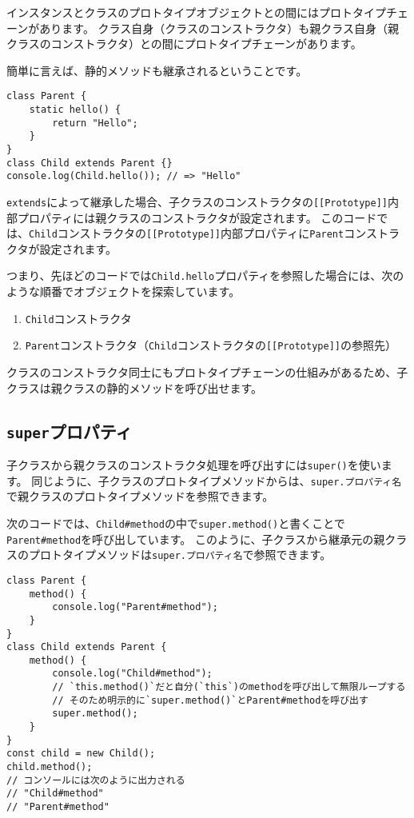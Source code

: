 インスタンスとクラスのプロトタイプオブジェクトとの間にはプロトタイプチェーンがあります。
クラス自身（クラスのコンストラクタ）も親クラス自身（親クラスのコンストラクタ）との間にプロトタイプチェーンがあります。

簡単に言えば、静的メソッドも継承されるということです。

\begin{lstlisting}
class Parent {
    static hello() {
        return "Hello";
    }
}
class Child extends Parent {}
console.log(Child.hello()); // => "Hello"
\end{lstlisting}

\texttt{extends}によって継承した場合、子クラスのコンストラクタの\texttt{[[Prototype]]}内部プロパティには親クラスのコンストラクタが設定されます。
このコードでは、\texttt{Child}コンストラクタの\texttt{[[Prototype]]}内部プロパティに\texttt{Parent}コンストラクタが設定されます。

つまり、先ほどのコードでは\texttt{Child.hello}プロパティを参照した場合には、次のような順番でオブジェクトを探索しています。

\begin{enumerate}
\def\labelenumi{\arabic{enumi}.}
\item
  \texttt{Child}コンストラクタ
\item
  \texttt{Parent}コンストラクタ（\texttt{Child}コンストラクタの\texttt{[[Prototype]]}の参照先）
\end{enumerate}

クラスのコンストラクタ同士にもプロトタイプチェーンの仕組みがあるため、子クラスは親クラスの静的メソッドを呼び出せます。

\hypertarget{super-property}{%
\subsection{\texorpdfstring{\texttt{super}プロパティ}{superプロパティ}}\label{super-property}}

子クラスから親クラスのコンストラクタ処理を呼び出すには\texttt{super()}を使います。
同じように、子クラスのプロトタイプメソッドからは、\texttt{super.プロパティ名}で親クラスのプロトタイプメソッドを参照できます。

次のコードでは、\texttt{Child\#method}の中で\texttt{super.method()}と書くことで\texttt{Parent\#method}を呼び出しています。
このように、子クラスから継承元の親クラスのプロトタイプメソッドは\texttt{super.プロパティ名}で参照できます。

\begin{lstlisting}
class Parent {
    method() {
        console.log("Parent#method");
    }
}
class Child extends Parent {
    method() {
        console.log("Child#method");
        // `this.method()`だと自分(`this`)のmethodを呼び出して無限ループする
        // そのため明示的に`super.method()`とParent#methodを呼び出す
        super.method();
    }
}
const child = new Child();
child.method(); 
// コンソールには次のように出力される
// "Child#method"
// "Parent#method"
\end{lstlisting}


